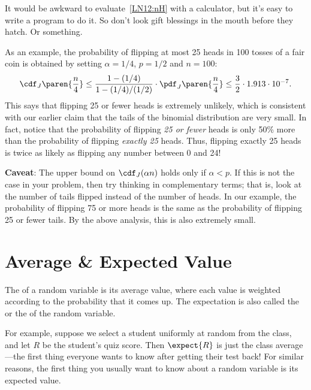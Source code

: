 It would be awkward to evaluate~\eqref{LN12:nH} with a calculator, but it's
easy to write a program to do it.  So don't look gift blessings in the
mouth before they hatch.  Or something.

As an example, the probability of flipping at most 25 heads in 100
tosses of a fair coin is obtained by setting $\alpha = 1/4$, $p = 1/2$
and $n = 100$:
%
\[
\cdf_J\paren{\frac{n}{4}} \leq \frac{1 - (1/4)}{1 - (1/4) / (1/2)}
                             \cdot \pdf_J\paren{\frac{n}{4}}
                    \leq \frac{3}{2} \cdot 1.913 \cdot 10^{-7}.
\]
%
This says that flipping 25 or fewer heads is extremely unlikely, which
is consistent with our earlier claim that the tails of the binomial
distribution are very small.  In fact, notice that the probability of
flipping \textit{25 or fewer} heads is only 50\% more than the
probability of flipping \textit{exactly 25} heads.  Thus, flipping
exactly 25 heads is twice as likely as flipping any number between 0
and 24!  

\noindent \textbf{Caveat}: The upper bound on $\cdf_J(\alpha n)$ holds
only if $\alpha < p$.  If this is not the case in your problem, then
try thinking in complementary terms; that is, look at the number of
tails flipped instead of the number of heads.  In our example,
the probability of flipping 75 or more heads is the same as
the probability of flipping 25 or fewer tails.  By the above
analysis, this is also extremely small.
\fi



\section{Average \& Expected Value}
The  of a random variable is its average value, where
each value is weighted according to the probability that it comes up.
The expectation is also called the  or the
 of the random variable.

For example, suppose we select a student uniformly at random from the
class, and let $R$ be the student's quiz score.  Then  $\expect{R}$ is just the class average ---the first
thing everyone wants to know after getting their test back!  For similar
reasons, the first thing you usually want to know about a random variable
is its expected value.

